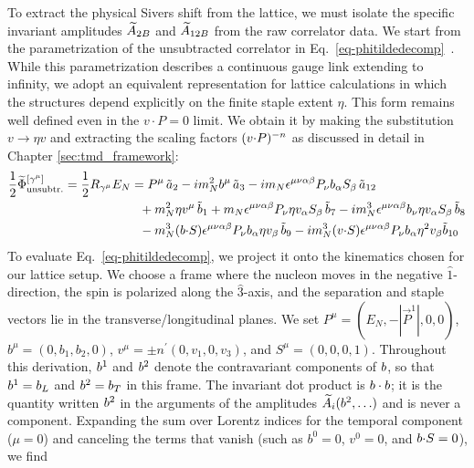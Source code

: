 To extract the physical Sivers shift from the lattice, we must isolate the specific invariant amplitudes $\widetilde{A}_{2B}$ and $\widetilde{A}_{12B}$ from the raw correlator data. We start from the parametrization of the unsubtracted correlator in Eq.~\eqref{eq-phitildedecomp}~\cite{Musch:2011er}. While this parametrization describes a continuous gauge link extending to infinity, we adopt an equivalent representation for lattice calculations in which the structures depend explicitly on the finite staple extent $\eta$. This form remains well defined even in the $v \cdot P = 0$ limit. We obtain it by making the substitution $v \rightarrow \eta v$ and extracting the scaling factors $(v {\cdot} P)^{-n}$ as discussed in detail in Chapter \ref{sec:tmd_framework}:
 \begin{align}
    \frac{1}{2}\widetilde \Phi^{[\gamma^\mu]}_{\text{unsubtr.}}=\frac{1}{2} R_{\gamma^{\mu}} E_N & =  
		P^\mu\, \tilde a_2 - i m_N^2 b^\mu\, \tilde a_3
		- i m_N \epsilon^{\mu \nu \alpha \beta} P_\nu b_\alpha S_\beta\, \tilde a_{12} \nonumber \\ &
		~~+ m_N^2 \eta v^\mu\, \tilde b_1 
		+ m_N \epsilon^{\mu \nu \alpha \beta} P_\nu \eta v_\alpha S_\beta\, \tilde b_7  
		-  i m_N^3 \epsilon^{\mu \nu \alpha \beta} b_\nu \eta v_\alpha S_\beta\, \tilde b_8 \nonumber \\ &
		~~- m_N^3 (b {\cdot} S) \epsilon^{\mu \nu \alpha \beta} P_\nu b_\alpha \eta v_\beta\, \tilde b_9
		-i m_N^3 (v {\cdot} S) \epsilon^{\mu \nu \alpha \beta} P_\nu b_\alpha \eta^2 v_\beta \tilde b_{10}
\end{align}
To evaluate Eq.~\eqref{eq-phitildedecomp}, we project it onto the kinematics chosen for our lattice setup. We choose a frame where the nucleon moves in the negative $\hat{1}$-direction, the spin is polarized along the $\hat{3}$-axis, and the separation and staple vectors lie in the transverse/longitudinal planes. We set $P^{\mu}=(E_N, -|\vec{P}^1|,0,0)$, $b^{\mu}=(0,b_{1},b_{2},0)$, $v^{\mu}=\pm n^{\prime}(0,v_{1},0,v_{3})$, and $S^{\mu}=(0,0,0,1)$. Throughout this derivation, $b^1$ and $b^2$ denote the contravariant components of $b$, so that $b^1=b_L$ and $b^2=b_T$ in this frame. The invariant dot product is $b\cdot b$; it is the quantity written $b^2$ in the arguments of the amplitudes $\widetilde{A}_i(b^2,\ldots)$ and is never a component. Expanding the sum over Lorentz indices for the temporal component ($\mu = 0$) and canceling the terms that vanish (such as $b^0 = 0$, $v^0 = 0$, and $b {\cdot} S = 0$), we find %
